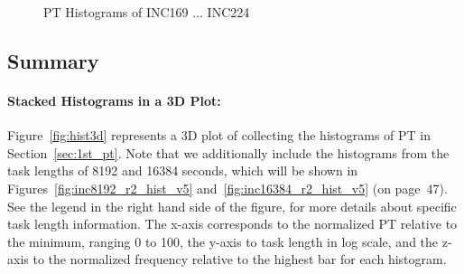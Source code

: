 \begin{figure}[hp!]
{		\label{fig:inc192_pt_hist}
	}
	\caption{PT Histograms of INC169 ... INC224~\label{fig:new_pt_hist4}}
\end{figure}

\pagebreak
\newpage

\subsection{Summary}

\paragraph{Stacked Histograms in a 3D Plot:}
Figure~\ref{fig:hist3d} represents a 3D plot of collecting the histograms of PT in Section~\ref{sec:1st_pt}. 
Note that we additionally include the histograms from the task lengths of 8192 and 16384 seconds, which will be shown in Figures~\ref{fig:inc8192_r2_hist_v5} and~\ref{fig:inc16384_r2_hist_v5} (on page~47). See the legend in the right hand side of the figure, for more details about specific task length information.
The x-axis corresponds to the normalized PT relative to the minimum, ranging 0 to 100, the y-axis to task length in log scale, and the z-axis to the normalized frequency relative to the highest bar for each histogram. 

